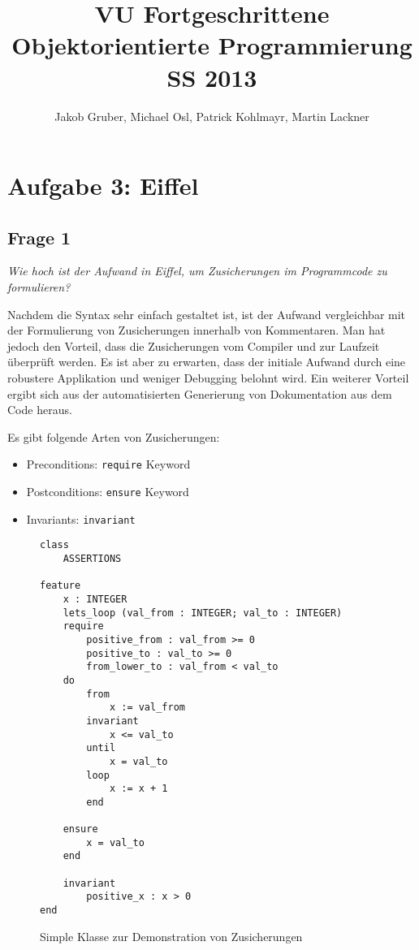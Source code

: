 \documentclass[a4paper,10pt]{article}
\title{VU Fortgeschrittene Objektorientierte Programmierung \\
       SS 2013}
\author{Jakob Gruber,
        Michael Osl,
        Patrick Kohlmayr,
        Martin Lackner}
\begin{document}
\maketitle

\section{Aufgabe 3: Eiffel}


\subsection{Frage 1}

\emph{Wie hoch ist der Aufwand in Eiffel, um Zusicherungen im Programmcode zu 
formulieren?}

\vspace{3mm}

Nachdem die Syntax sehr einfach gestaltet ist, ist der Aufwand vergleichbar mit der Formulierung von Zusicherungen innerhalb von Kommentaren. Man hat jedoch den Vorteil, dass die Zusicherungen vom Compiler und zur Laufzeit \"uberpr\"uft werden. Es ist aber zu erwarten, dass der initiale Aufwand durch eine robustere Applikation und weniger Debugging belohnt wird. Ein weiterer Vorteil ergibt sich aus der automatisierten Generierung von Dokumentation aus dem Code heraus.

Es gibt folgende Arten von Zusicherungen:

\begin{itemize}
    \item Preconditions: \verb+require+ Keyword
    \item Postconditions: \verb+ensure+ Keyword
    \item Invariants: \verb+invariant+
\end{itemize}

\begin{figure}
\begin{lstlisting}
class
    ASSERTIONS 

feature
    x : INTEGER
    lets_loop (val_from : INTEGER; val_to : INTEGER)
    require
        positive_from : val_from >= 0
        positive_to : val_to >= 0
        from_lower_to : val_from < val_to
    do
        from
            x := val_from
        invariant
            x <= val_to
        until
            x = val_to
        loop
            x := x + 1
        end

    ensure
        x = val_to
    end

    invariant
        positive_x : x > 0
end
\end{lstlisting}
\label{lst:assertprog}
\caption{Simple Klasse zur Demonstration von Zusicherungen}
\end{figure}
\end{document}
